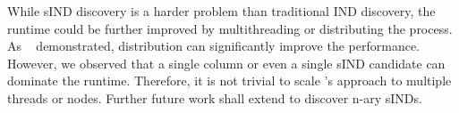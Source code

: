 %
While sIND discovery is a harder problem than traditional IND discovery, the runtime could be further improved by multithreading or distributing the process.
As ~\cite{dursch2019eval} demonstrated, distribution can significantly improve the performance.
However, we observed that a single column or even a single sIND candidate can dominate the runtime.
Therefore, it is not trivial to scale \sawfish's approach to multiple threads or nodes.
Further future work shall extend \sawfish to discover n-ary sINDs.%
%
%

